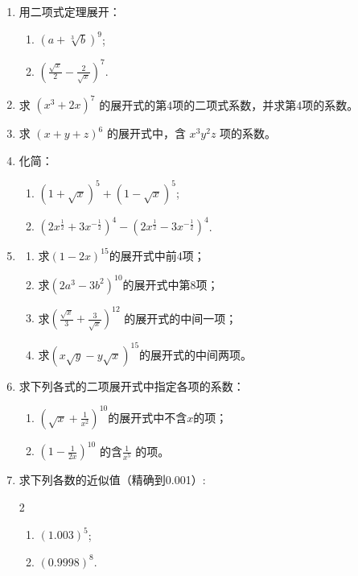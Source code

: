 \begin{enumerate}
    \item 用二项式定理展开：
\begin{enumerate}[(1)]
    \item $(a+\sqrt[3]{b})^{9}$;
 \item $\left(\frac{\sqrt{x}}{2}-\frac{2}{\sqrt{x}}\right)^{7}$.
\end{enumerate}

\item 求 $\left(x^{3}+2x\right)^{7}$ 的展开式的第4项的二项式系数，并求第4项的系数。
\item 求 $(x+y+z)^{6}$ 的展开式中，含 $x^{3}y^{2}z$ 项的系数。
\item 化简：
\begin{enumerate}[(1)]
 \item $(1+\sqrt{x})^{5}+(1-\sqrt{x})^{5}$;
 \item $\left(2x^{\tfrac{1}{2}}+3x^{-\tfrac{1}{2}}\right)^{4}-\left(2x^{\tfrac{1}{2}}-3x^{-\tfrac{1}{2}}\right)^{4}$.
\end{enumerate}

\item \begin{enumerate}[(1)]
    \item 求$ (1-2x)^{15} $的展开式中前4项；
    \item 求$ \left(2a^{3}-3b^{2}\right)^{10} $的展开式中第8项；
    \item 求$ \left(\frac{\sqrt{x}}{3}+\frac{3}{\sqrt{x}}\right)^{12}$ 的展开式的中间一项；
    \item 求$ (x\sqrt{y}-y\sqrt{x})^{15} $的展开式的中间两项。
\end{enumerate}

\item 求下列各式的二项展开式中指定各项的系数：
\begin{enumerate}[(1)]
    \item $\left(\sqrt{x}+\frac{1}{x^{2}}\right)^{10} $的展开式中不含$x$的项；
    \item $\left(1-\frac{1}{2x}\right)^{10}$ 的含$ \frac{1}{x^{5}}$ 的项。
\end{enumerate}

\item 
求下列各数的近似值（精确到0.001）:
\begin{multicols}{2}
\begin{enumerate}[(1)]
    \item $(1.003)^{5}$;
    \item $(0.9998)^{8}$.
\end{enumerate}
\end{multicols}


\end{enumerate}
